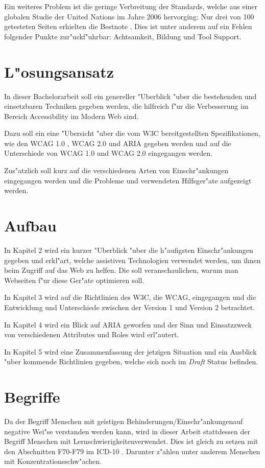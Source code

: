 \documentclass[a4paper,bibtotoc,oneside]{scrbook}
\begin{document}
Ein weiteres Problem ist die geringe Verbreitung der Standards, welche aus einer globalen Studie der United Nations im Jahre 2006 hervorging\cite{acc_report}: Nur drei von 100 getesteten Seiten erhielten die Bestnote \cite [S. 7]{acc_report}. Dies ist unter anderem auf ein Fehlen folgender Punkte zur"uckf"uhrbar: Achtsamkeit, Bildung und Tool Support\cite[S. 13]{tool_acc}.


\section{L"osungsansatz}
In dieser Bachelorarbeit soll ein genereller "Uberblick "uber die bestehenden und einsetzbaren Techniken gegeben werden, die hilfreich f"ur die Verbesserung im Bereich Accessibility im Modern Web sind. 

Dazu soll ein eine "Ubersicht "uber die vom W3C bereitgestellten Spezifikationen, wie den WCAG 1.0 \cite{wcag1}, WCAG 2.0 \cite{wcag2} und ARIA \cite{aria} gegeben werden und auf die Unterschiede von WCAG 1.0 und WCAG 2.0 eingegangen werden.

Zus"atzlich soll kurz auf die verschiedenen Arten von Einschr"ankungen eingegangen werden und die Probleme und verwendeten Hilfsger"ate aufgezeigt werden.

\section{Aufbau}
In Kapitel 2 wird ein kurzer "Uberblick "uber die h"aufigsten Einschr"ankungen gegeben und erkl"art, welche assistiven Technologien verwendet werden, um ihnen beim Zugriff auf das Web zu helfen. Die soll veranschaulichen, warum man Webseiten f"ur diese Ger"ate optimieren soll.

In Kapitel 3 wird auf die Richtlinien des W3C, die WCAG, eingegangen und die Entwicklung und Unterschiede zwischen der Version 1 und Version 2 betrachtet.

In Kapitel 4 wird ein Blick auf ARIA geworfen und der Sinn und Einsatzzweck von verschiedenen Attributes und Roles wird erl"autert.

In Kapitel 5 wird eine Zusammenfassung der jetzigen Situation und ein Ausblick "uber kommende Richtlinien gegeben, welche sich noch im \emph{Draft} Status befinden.

\section{Begriffe}
Da der Begriff \glqq Menschen mit geistigen Behinderungen/Einschr"ankungen\grqq auf negative Wei"se verstanden werden kann, wird in dieser Arbeit stattdessen der Begriff \glqq Menschen mit Lernschwierigkeiten\grqq  verwendet. Dies ist gleich zu setzen mit den Abschnitten F70-F79 im ICD-10 \cite{icd10}. Darunter z"ahlen unter anderem Menschen mit Konzentrationsschw"achen.
\end{document}
